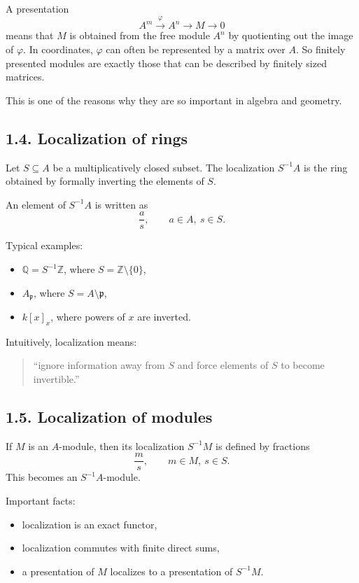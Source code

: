 \documentclass[12pt,a4paper]{article}
\theoremstyle{plain}
\theoremstyle{definition}      %
\begin{document}
A presentation
\[
A^m \xrightarrow{\varphi} A^n \to M \to 0
\]
means that \(M\) is obtained from the free module \(A^n\) by quotienting out the image of \(\varphi\). In coordinates, \(\varphi\) can often be represented by a matrix over \(A\). So finitely presented modules are exactly those that can be described by finitely sized matrices.

This is one of the reasons why they are so important in algebra and geometry.

\subsection*{1.4. Localization of rings}

Let \(S\subseteq A\) be a multiplicatively closed subset. The localization \(S^{-1}A\) is the ring obtained by formally inverting the elements of \(S\).

An element of \(S^{-1}A\) is written as
\[
\frac{a}{s},\qquad a\in A,\ s\in S.
\]

Typical examples:
\begin{itemize}
	\item \(\mathbb{Q}=S^{-1}\mathbb{Z}\), where \(S=\mathbb{Z}\setminus\{0\}\),
	\item \(A_{\mathfrak p}\), where \(S=A\setminus \mathfrak p\),
	\item \(k[x]_x\), where powers of \(x\) are inverted.
\end{itemize}

Intuitively, localization means:
\begin{quote}
	``ignore information away from \(S\) and force elements of \(S\) to become invertible.''
\end{quote}

\subsection*{1.5. Localization of modules}

If \(M\) is an \(A\)-module, then its localization \(S^{-1}M\) is defined by fractions
\[
\frac{m}{s},\qquad m\in M,\ s\in S.
\]
This becomes an \(S^{-1}A\)-module.

Important facts:
\begin{itemize}
	\item localization is an exact functor,
	\item localization commutes with finite direct sums,
	\item a presentation of \(M\) localizes to a presentation of \(S^{-1}M\).
\end{itemize}
\end{document}

